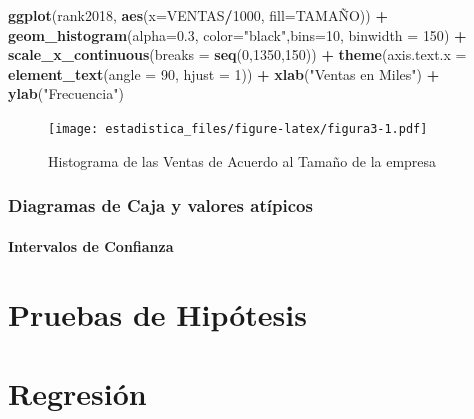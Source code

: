 \documentclass[]{book}
\newenvironment{Shaded}{\begin{snugshade}}{\end{snugshade}}
\newcommand{\KeywordTok}[1]{\textcolor[rgb]{0.13,0.29,0.53}{\textbf{#1}}}
\newcommand{\DataTypeTok}[1]{\textcolor[rgb]{0.13,0.29,0.53}{#1}}
\newcommand{\DecValTok}[1]{\textcolor[rgb]{0.00,0.00,0.81}{#1}}
\newcommand{\FloatTok}[1]{\textcolor[rgb]{0.00,0.00,0.81}{#1}}
\newcommand{\StringTok}[1]{\textcolor[rgb]{0.31,0.60,0.02}{#1}}
\newcommand{\OperatorTok}[1]{\textcolor[rgb]{0.81,0.36,0.00}{\textbf{#1}}}
\newcommand{\NormalTok}[1]{#1}
\begin{document}
\begin{Shaded}
\begin{Highlighting}[]
\KeywordTok{ggplot}\NormalTok{(rank2018, }\KeywordTok{aes}\NormalTok{(}\DataTypeTok{x=}\NormalTok{VENTAS}\OperatorTok{/}\DecValTok{1000}\NormalTok{, }\DataTypeTok{fill=}\NormalTok{TAMAÑO)) }\OperatorTok{+}\StringTok{ }
\StringTok{  }\KeywordTok{geom_histogram}\NormalTok{(}\DataTypeTok{alpha=}\FloatTok{0.3}\NormalTok{, }\DataTypeTok{color=}\StringTok{"black"}\NormalTok{,}\DataTypeTok{bins=}\DecValTok{10}\NormalTok{, }\DataTypeTok{binwidth =} \DecValTok{150}\NormalTok{) }\OperatorTok{+}
\StringTok{  }\KeywordTok{scale_x_continuous}\NormalTok{(}\DataTypeTok{breaks =} \KeywordTok{seq}\NormalTok{(}\DecValTok{0}\NormalTok{,}\DecValTok{1350}\NormalTok{,}\DecValTok{150}\NormalTok{)) }\OperatorTok{+}
\StringTok{  }\KeywordTok{theme}\NormalTok{(}\DataTypeTok{axis.text.x =} \KeywordTok{element_text}\NormalTok{(}\DataTypeTok{angle =} \DecValTok{90}\NormalTok{, }\DataTypeTok{hjust =} \DecValTok{1}\NormalTok{)) }\OperatorTok{+}
\StringTok{  }\KeywordTok{xlab}\NormalTok{(}\StringTok{"Ventas en Miles"}\NormalTok{) }\OperatorTok{+}\StringTok{ }\KeywordTok{ylab}\NormalTok{(}\StringTok{"Frecuencia"}\NormalTok{)}
\end{Highlighting}
\end{Shaded}

\begin{figure}
\centering
\texttt{[image: estadistica\_files/figure-latex/figura3-1.pdf]}
\caption{\label{fig:figura3}Histograma de las Ventas de Acuerdo al Tamaño de
la empresa}
\end{figure}

\subsection{Diagramas de Caja y valores
atípicos}\label{diagramas-de-caja-y-valores-atipicos}

\subsubsection{Intervalos de Confianza}\label{intervalos-de-confianza}

\chapter{Pruebas de Hipótesis}\label{pruebas-de-hipotesis}

\chapter{Regresión}\label{methods}
\end{document}
